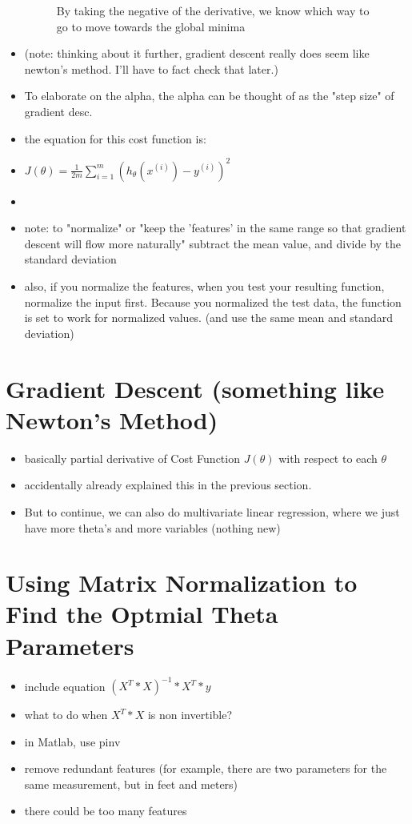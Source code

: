 \documentclass[]{article}
\begin{document}
\begin{itemize}
\begin{figure}[ht!]
		\caption{By taking the negative of the derivative, we know which way to go to move towards the global minima}
	\end{figure}
	\item (note: thinking about it further, gradient descent really does seem like newton's method. I'll have to fact check that later.)
	\item To elaborate on the alpha, the alpha can be thought of as the "step size" of gradient desc.
	
	\item the equation for this cost function is:
	\item $J(\theta)=\frac{1}{2m}\sum\limits_{i=1}^{m}(h_\theta(x^{(i)})-y^{(i)})^2$
	\item 
\end{itemize}

\begin{itemize}
\item note: to "normalize" or "keep the 'features' in the same range so that gradient descent will flow more naturally"  subtract the mean value, and divide by the standard deviation
\item also, if you normalize the features, when you test your resulting function, normalize the input first. Because you normalized the test data, the function is set to work for normalized values. (and use the same mean and standard deviation)
\end{itemize}

\section{Gradient Descent (something like Newton's Method)}
\begin{itemize}
	\item basically partial derivative of Cost Function $J(\theta)$ with respect to each $\theta$
	\item accidentally already explained this in the previous section.
	\item But to continue, we can also do multivariate linear regression, where we just have more theta's and more variables (nothing new)
\end{itemize}

\section{Using Matrix Normalization to Find the Optmial Theta Parameters}
	\begin{itemize}
		\item include equation $ (X^T*X)^{-1}*X^T*y$
		\item what to do when $X^T*X$ is non invertible?
		\item in Matlab, use pinv
		\item remove redundant features (for example, there are two parameters for the same measurement, but in feet and meters)
		\item there could be too many features
	\end{itemize}
\end{document}
